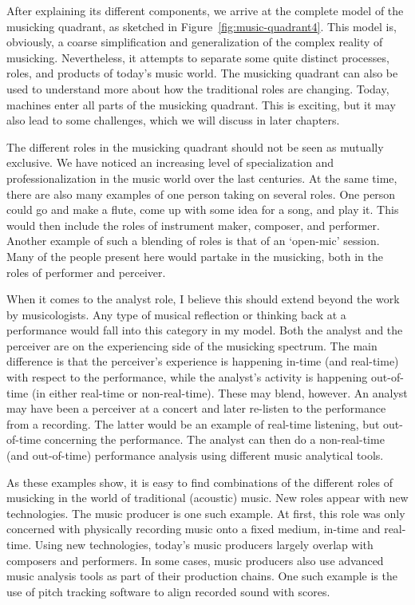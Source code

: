 After explaining its different components, we arrive at the complete model of the musicking quadrant, as sketched in Figure~\ref{fig:music-quadrant4}.
This model is, obviously, a coarse simplification and generalization of the complex reality of musicking. Nevertheless, it attempts to separate some quite distinct processes, roles, and products of today's music world. The musicking quadrant can also be used to understand more about how the traditional roles are changing. Today, machines enter all parts of the musicking quadrant. This is exciting, but it may also lead to some challenges, which we will discuss in later chapters.

The different roles in the musicking quadrant should not be seen as mutually exclusive. We have noticed an increasing level of specialization and professionalization in the music world over the last centuries. At the same time, there are also many examples of one person taking on several roles. One person could go and make a flute, come up with some idea for a song, and play it. This would then include the roles of instrument maker, composer, and performer. Another example of such a blending of roles is that of an `open-mic' session. Many of the people present here would partake in the musicking, both in the roles of performer and perceiver.

When it comes to the analyst role, I believe this should extend beyond the work by musicologists. Any type of musical reflection or thinking back at a performance would fall into this category in my model. Both the analyst and the perceiver are on the experiencing side of the musicking spectrum. The main difference is that the perceiver's experience is happening in-time (and real-time) with respect to the performance, while the analyst's activity is happening out-of-time (in either real-time or non-real-time). These may blend, however. An analyst may have been a perceiver at a concert and later re-listen to the performance from a recording. The latter would be an example of real-time listening, but out-of-time concerning the performance. The analyst can then do a non-real-time (and out-of-time) performance analysis using different music analytical tools.

As these examples show, it is easy to find combinations of the different roles of musicking in the world of traditional (acoustic) music. New roles appear with new technologies. The music producer is one such example. At first, this role was only concerned with physically recording music onto a fixed medium, in-time and real-time. Using new technologies, today's music producers largely overlap with composers and performers. In some cases, music producers also use advanced music analysis tools as part of their production chains. One such example is the use of pitch tracking software to align recorded sound with scores.

